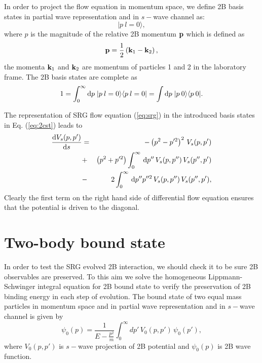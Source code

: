 \documentclass[aps,prc,preprint,groupedaddress]{revtex4-1}
\newcommand{\rd}{\ensuremath{\hbox{d}}}
\newcommand{\id}{\ensuremath{\,\rd}}
\begin{document}
In order to project the flow equation in momentum space, we define 2B basis states in partial wave representation and in $s-$wave channel as:
\begin{equation}
  \label{eq:2cst}
  |p \:l=0\rangle,
\end{equation}
where $p$ is the magnitude of the relative 2B momentum ${\bf p}$ which is defined as
\begin{equation}
  \label{eq:jacobi}
  {\bf p}=\frac{1}{2}\left({\bf k}_1-{\bf k}_2\right),
\end{equation}
the momenta ${\bf k}_1$ and ${\bf k}_2$ are momentum of particles 1 and 2 in the laboratory frame.  The 2B basis states are complete as
\begin{equation}
  \label{eq:completness}
  1=\int_0^\infty \hbox{d}p\;|p \:l=0\rangle\langle p \: l=0|=\int \hbox{d}p\;|p\:
  0\rangle\langle p\: 0| .
\end{equation}


The representation of SRG flow equation (\ref{eq:srg}) in the introduced basis states in Eq. (\ref{eq:2cst}) leads to
\begin{eqnarray}
\label{eq:two_body_momspace}
\nonumber
\frac{\rd V_s(p,p')}{\rd s} &=& -\left( p^2-p'^2 \right )^2\, V_s(p,p') \\ 
\nonumber
&+& \left ( p^2+p'^2 \right )\int_{0}^{\infty} \id p'' \,  V_s(p,p'') \, V_s(p'',p') \\
&-&2\int_{0}^{\infty} \id p'' p''^2 \,  V_s(p,p'') \, V_s(p'',p') ,
\end{eqnarray}
Clearly the first term on the right hand side of differential flow equation ensures that the potential is
driven to the diagonal.


\section{Two-body bound state}

In order to test the SRG evolved 2B interaction, we should check it to be sure 2B observables are preserved. To this aim we solve the homogeneous Lippmann-Schwinger integral equation for 2B bound state to verify the preservation of 2B binding energy in each step of evolution.
The bound state of two equal mass particles in momentum space and in partial wave representation and in $s-$wave channel is given by
\begin{equation}
\psi_0(p) = \frac{1}{E-\frac{p^2}{m}} \int_{0}^{\infty} dp' \, V_0(p,p') \, \psi_0(p'),
\end{equation}
where $V_0(p,p')$ is $s-$wave projection of 2B potential and $\psi_0(p)$ is 2B wave function.
\end{document}
